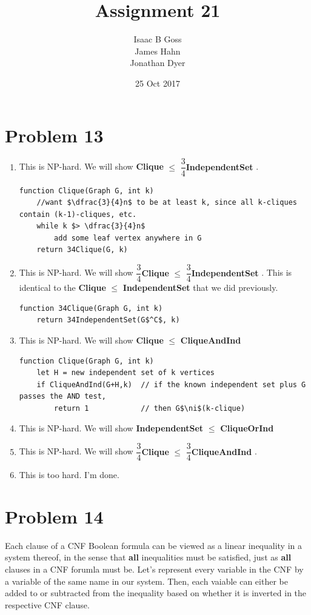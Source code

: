 \documentclass{article}
\author{Isaac B Goss\\ James Hahn\\ Jonathan Dyer}
\title{Assignment 21}
\date{25 Oct 2017}
\providecommand{\prob}[1]{\section*{Problem #1}}
\providecommand{\reducible}[2]{
  \textbf{#1} $\leq$ \textbf{#2}
}
\begin{document}
\maketitle

\prob{13}
\begin{enumerate}[label=(\alph*)]
 \item This is NP-hard. We will show \reducible{Clique}{$\dfrac{3}{4}$IndependentSet}.
       \begin{lstlisting}
function Clique(Graph G, int k)
    //want $\dfrac{3}{4}n$ to be at least k, since all k-cliques contain (k-1)-cliques, etc.
    while k $> \dfrac{3}{4}n$
        add some leaf vertex anywhere in G
    return 34Clique(G, k)
 \end{lstlisting}

 \item This is NP-hard. We will show \reducible{$\dfrac{3}{4}$Clique}{$\dfrac{3}{4}$IndependentSet}. This is identical to the \reducible{Clique}{IndependentSet} that we did previously.
       \begin{lstlisting}
function 34Clique(Graph G, int k)
    return 34IndependentSet(G$^C$, k)
  \end{lstlisting}

 \item This is NP-hard. We will show \reducible{Clique}{CliqueAndInd}
       \begin{lstlisting}
function Clique(Graph G, int k)
    let H = new independent set of k vertices
    if CliqueAndInd(G+H,k)  // if the known independent set plus G passes the AND test, 
        return 1            // then G$\ni$(k-clique)
  \end{lstlisting}

 \item This is NP-hard. We will show  \reducible{IndependentSet}{CliqueOrInd}

 \item This is NP-hard. We will show \reducible{$\dfrac{3}{4}$Clique}{$\dfrac{3}{4}$CliqueAndInd}.

 \item This is too hard. I'm done.
\end{enumerate}

\pagebreak
\prob{14}
Each clause of a CNF Boolean formula can be viewed as a linear inequality in a system thereof,
in the sense that \textbf{all} inequalities must be satisfied, 
just as \textbf{all} clauses in a CNF forumla must be.
Let's represent every variable in the CNF by a variable of the same name in our system.
Then, each vaiable can either be added to or subtracted from the inequality based on whether it is inverted in the respective CNF clause.
\end{document}
